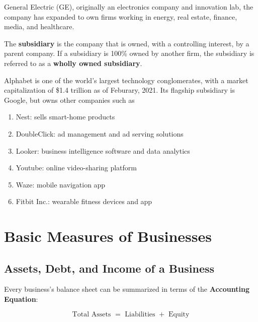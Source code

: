 \documentclass{article}
\begin{document}
      \begin{example}
        General Electric (GE), originally an electronics company and innovation lab, the company has expanded to own firms working in energy, real estate, finance, media, and healthcare. 
      \end{example}

      \begin{definition}[Subsidiary]
        The \textbf{subsidiary} is the company that is owned, with a controlling interest, by a parent company. If a subsidiary is 100\% owned by another firm, the subsidiary is referred to as a \textbf{wholly owned subsidiary}. 
      \end{definition}

      \begin{definition}[Alphabet]
        Alphabet is one of the world's largest technology conglomerates, with a market capitalization of \$1.4 trillion as of Feburary, 2021. Its flagship subsidiary is Google, but owns other companies such as
        \begin{enumerate}
          \item Nest: sells smart-home products
          \item DoubleClick: ad management and ad serving solutions
          \item Looker: business intelligence software and data analytics
          \item Youtube: online video-sharing platform
          \item Waze: mobile navigation app
          \item Fitbit Inc.: wearable fitness devices and app
        \end{enumerate}
      \end{definition}

\section*{Basic Measures of Businesses} 

\subsection*{Assets, Debt, and Income of a Business}

Every business's balance sheet can be summarized in terms of the \textbf{Accounting Equation}:

\begin{equation}
  \text{Total Assets } = \text{ Liabilities } + \text{ Equity}
\end{equation}
\end{document}
